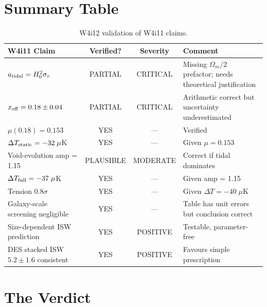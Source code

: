 \documentclass[11pt,a4paper]{article}
\newcommand{\Hzero}{H_0}
\newcommand{\mufd}{\mu}
\newcommand{\Omm}{\Omega_m}
\begin{document}
\section{Summary Table}
\label{sec:summary}

\begin{table}[H]
\centering
\caption{W4i12 validation of W4i11 claims.}
\begin{tabular}{p{5cm}ccp{3.5cm}}
\toprule
\textbf{W4i11 Claim} & \textbf{Verified?} & \textbf{Severity} &
  \textbf{Comment} \\
\midrule
$a_{\rm tidal} = \Hzero^2\sigma_v$ & PARTIAL & CRITICAL &
  Missing $\Omm/2$ prefactor; needs theoretical justification \\
$x_{\rm eff} = 0.18 \pm 0.04$ & PARTIAL & CRITICAL &
  Arithmetic correct but uncertainty underestimated \\
$\mufd(0.18) = 0.153$ & YES & --- & Verified \\
$\Delta T_{\rm static} = -32\;\mu$K & YES & --- &
  Given $\mufd = 0.153$ \\
Void-evolution amp = 1.15 & PLAUSIBLE & MODERATE &
  Correct if tidal dominates \\
$\Delta T_{\rm full} = -37\;\mu$K & YES & --- &
  Given amp = 1.15 \\
Tension $0.8\sigma$ & YES & --- &
  Given $\Delta T = -40\;\mu$K \\
Galaxy-scale screening negligible & YES & --- &
  Table has unit errors but conclusion correct \\
Size-dependent ISW prediction & YES & POSITIVE &
  Testable, parameter-free \\
DES stacked ISW $5.2 \pm 1.6$ consistent & YES & POSITIVE &
  Favours simple prescription \\
\bottomrule
\end{tabular}
\end{table}


\section{The Verdict}
\label{sec:verdict-final}
\end{document}
